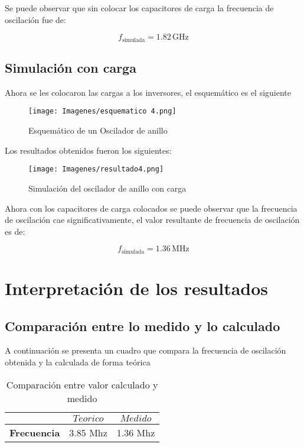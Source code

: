 \documentclass[11pt, a4paper]{article}
\begin{document}
Se puede observar que sin colocar los capacitores de carga la frecuencia de oscilación fue de:

\begin{equation}
f_{\text{simulada}} = 1.82 \, \mathrm{GHz}
\end{equation}

\subsection{Simulación con carga}

Ahora se les colocaron las cargas a los inversores, el esquemático es el siguiente
\begin{figure}[H]
    \centering
    \texttt{[image: Imagenes/esquematico 4.png]}
    \caption{Esquemático de un Oscilador de anillo}
    \label{fig:esquematico 4}
    \end{figure}

Los resultados obtenidos fueron los siguientes:

\begin{figure}[H]
    \centering
    \texttt{[image: Imagenes/resultado4.png]}
    \caption{Simulación del oscilador de anillo con carga}
    \label{fig:resultado4}
    \end{figure}

Ahora con los capacitores de carga colocados se puede observar que la frecuencia de oscilación cae significativamente, el valor resultante de frecuencia de oscilación es de:

\begin{equation}
f_{\text{simulada}} = 1.36 \, \mathrm{MHz}
\end{equation}

\section{Interpretación de los resultados}
\subsection{Comparación entre lo medido y lo calculado}

A continuación se presenta un cuadro que compara la frecuencia de oscilación obtenida y la calculada de forma teórica
\begin{table}[H]
\centering
\begin{tabular}{|c|c|c|}
\hline
 & $Teorico$ & $Medido$\\ \hline
\textbf{Frecuencia} & 3.85 Mhz & 1.36 Mhz \\ \hline
\end{tabular}
\caption{Comparación entre valor calculado y medido}
\label{tab:two_by_two}
\end{table}
\end{document}
